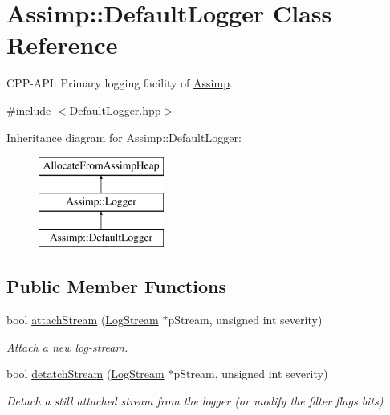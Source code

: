 \hypertarget{class_assimp_1_1_default_logger}{}\section{Assimp\+:\+:Default\+Logger Class Reference}
\label{class_assimp_1_1_default_logger}


C\+P\+P-\/\+A\+PI\+: Primary logging facility of \hyperlink{namespace_assimp}{Assimp}.  




{\ttfamily \#include $<$Default\+Logger.\+hpp$>$}

Inheritance diagram for Assimp\+:\+:Default\+Logger\+:\begin{figure}[H]
\begin{center}
\leavevmode
\includegraphics[height=3.000000cm]{class_assimp_1_1_default_logger}
\end{center}
\end{figure}
\subsection*{Public Member Functions}
\begin{DoxyCompactItemize}
\item 
bool \hyperlink{class_assimp_1_1_default_logger_abc0ca7a337f8c3e38eca0eb45bb1ccf0}{attach\+Stream} (\hyperlink{class_assimp_1_1_log_stream}{Log\+Stream} $\ast$p\+Stream, unsigned int severity)
\begin{DoxyCompactList}\small\item\em Attach a new log-\/stream. \end{DoxyCompactList}\item 
bool \hyperlink{class_assimp_1_1_default_logger_a2615f1d1624f1d742d0cf2dd4a5cccc8}{detatch\+Stream} (\hyperlink{class_assimp_1_1_log_stream}{Log\+Stream} $\ast$p\+Stream, unsigned int severity)
\begin{DoxyCompactList}\small\item\em Detach a still attached stream from the logger (or modify the filter flags bits) \end{DoxyCompactList}\end{DoxyCompactItemize}
